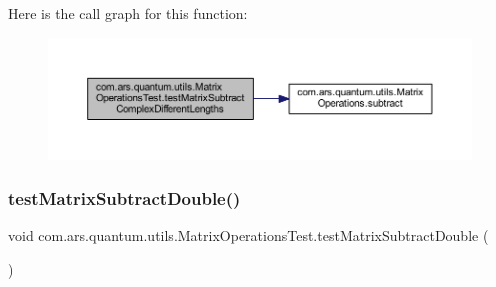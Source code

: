 Here is the call graph for this function\+:\nopagebreak
\begin{figure}[H]
\begin{center}
\leavevmode
\includegraphics[width=350pt]{classcom_1_1ars_1_1quantum_1_1utils_1_1_matrix_operations_test_af0c58a11a8b195509365a0f786041c86_cgraph}
\end{center}
\end{figure}
\hypertarget{classcom_1_1ars_1_1quantum_1_1utils_1_1_matrix_operations_test_a531e80f804f35d3f8fd8d35eab4b4faa}{}\label{classcom_1_1ars_1_1quantum_1_1utils_1_1_matrix_operations_test_a531e80f804f35d3f8fd8d35eab4b4faa} 
\subsubsection{\texorpdfstring{test\+Matrix\+Subtract\+Double()}{testMatrixSubtractDouble()}}
{\footnotesize\ttfamily void com.\+ars.\+quantum.\+utils.\+Matrix\+Operations\+Test.\+test\+Matrix\+Subtract\+Double (\begin{DoxyParamCaption}{ }\end{DoxyParamCaption})}

